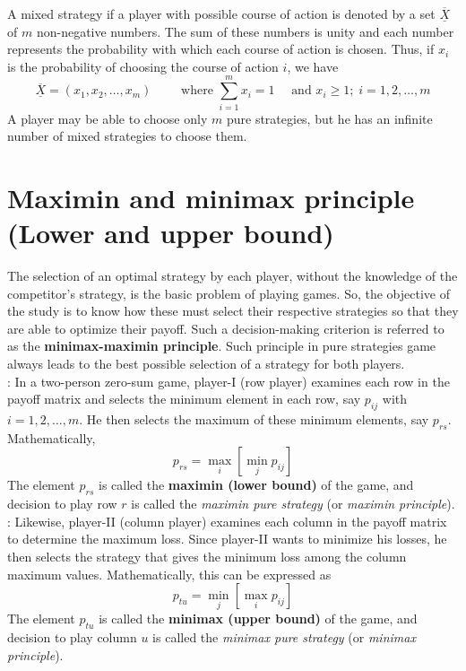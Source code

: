 \documentclass[../main-sheet.tex]{subfiles}
\begin{document}
A mixed strategy if a player with possible course of action is denoted by a set \(\underline{\overline{X}}\)%
of \(m\) non-negative numbers. The sum of these numbers is unity and each number represents the probability with which each course of action is chosen. Thus, if \(x_i\) is the probability of choosing the course of action \(i\), we have
\[
    \underline{\overline{X}}=\left(x_1,x_2,\dots,x_m\right) \qquad\text{ where }\sum_{i=1}^m x_i=1\quad \text{ and } x_i\geq 1;\;i=1,2,\dots,m
\]
A player may be able to choose only \(m\) pure strategies, but he has an infinite number of mixed strategies to choose them.
\section{Maximin and minimax principle (Lower and upper bound)}
The selection of an optimal strategy by each player, without the knowledge of the competitor's strategy, is the basic problem of playing games. So, the objective of the study is to know how these must select their respective strategies so that they are able to optimize their payoff. Such a decision-making criterion is referred to as the \textbf{minimax-maximin principle}. Such principle in pure strategies game always leads to the best possible selection of a strategy for both players.\\

: In a two-person zero-sum game, player-I (row player) examines each row in the payoff matrix and selects the minimum element in each row, say \(p_{ij}\) with \(i=1,2,\dots,m\). He then selects the maximum of these minimum elements, say \(p_{rs}\). Mathematically, \[ p_{rs}=\max_{i}\left[\min_{j}p_{ij}\right]\]
The element \(p_{rs}\) is called the \textbf{maximin (lower bound)} of the game, and decision to play row \(r\) is called the \emph{maximin pure strategy} (or \emph{maximin principle}).\\


: Likewise, player-II (column player) examines each column in the payoff matrix to determine the maximum loss. Since player-II wants to minimize his losses, he then selects the strategy that gives the minimum loss among the column maximum values. Mathematically, this can be expressed as
\[
    p_{tu}=\min_j\left[\max_i p_{ij}\right]
\]
The element \(p_{tu}\) is called the \textbf{minimax (upper bound)} of the game, and decision to play column \(u\) is called the \emph{minimax pure strategy} (or \emph{minimax principle}).
\end{document}

